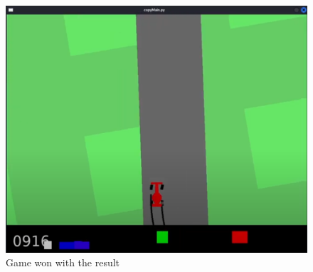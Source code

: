 \documentclass[runningheads]{llncs}
\begin{document}
\begin{figure}
  \includegraphics[width=\textwidth]{Screenshots/game_won.png}
  \caption{Game won with the result}
  \label{fig:game_won}
\end{figure}
\end{document}
